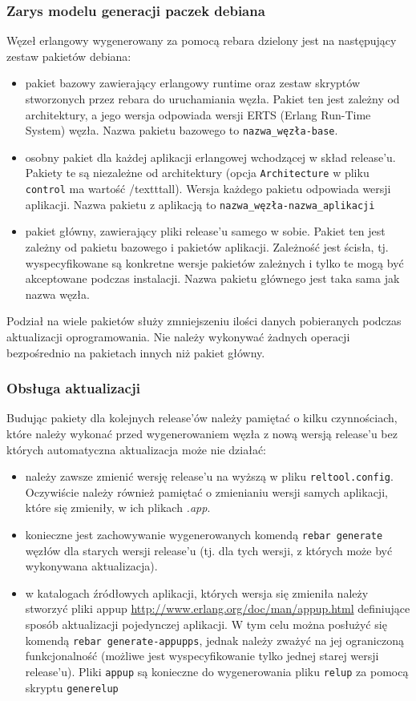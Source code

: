 \documentclass[polish,12pt]{aghthesis}
\begin{document}
\subsubsection{Zarys modelu generacji paczek debiana}
Węzeł erlangowy wygenerowany za pomocą rebara dzielony jest na następujący zestaw pakietów debiana:
\begin{itemize}
\item pakiet bazowy zawierający erlangowy runtime oraz zestaw skryptów stworzonych przez rebara do uruchamiania węzła. Pakiet ten jest zależny od architektury, a jego wersja odpowiada wersji ERTS (Erlang Run-Time System) węzła. Nazwa pakietu bazowego to \texttt{nazwa\_węzła-base}.
\item osobny pakiet dla każdej aplikacji erlangowej wchodzącej w skład release'u. Pakiety te są niezależne od architektury (opcja \texttt{Architecture} w pliku \texttt{control} ma wartość /texttt{all}). Wersja każdego pakietu odpowiada wersji aplikacji. Nazwa pakietu z aplikacją to \texttt{nazwa\_węzła-nazwa\_aplikacji}
\item pakiet główny, zawierający pliki release'u samego w sobie. Pakiet ten jest zależny od pakietu bazowego i pakietów aplikacji. Zależność jest ścisła, tj. wyspecyfikowane są konkretne wersje pakietów zależnych i tylko te mogą być akceptowane podczas instalacji. Nazwa pakietu głównego jest taka sama jak nazwa węzła.
\end{itemize}

Podział na wiele pakietów służy zmniejszeniu ilości danych pobieranych podczas aktualizacji oprogramowania. Nie należy wykonywać żadnych operacji bezpośrednio na pakietach innych niż pakiet główny.

\subsubsection{Obsługa aktualizacji}
Budując pakiety dla kolejnych release'ów należy pamiętać o kilku czynnościach, które należy wykonać przed wygenerowaniem węzła z nową wersją release'u bez których automatyczna aktualizacja może nie działać:
\begin{itemize}
\item należy zawsze zmienić wersję release'u na wyższą w pliku \texttt{reltool.config}. Oczywiście należy również pamiętać o zmienianiu wersji samych aplikacji, które się zmieniły, w ich plikach \emph{.app}.
\item konieczne jest zachowywanie wygenerowanych komendą \texttt{rebar generate} węzłów dla starych wersji release'u (tj. dla tych wersji, z których może być wykonywana aktualizacja).
\item w katalogach źródłowych aplikacji, których wersja się zmieniła należy stworzyć pliki appup \url{http://www.erlang.org/doc/man/appup.html} definiujące sposób aktualizacji pojedynczej aplikacji. W tym celu można posłużyć się komendą \texttt{rebar\ generate-appupps}, jednak należy zważyć na jej ograniczoną funkcjonalność (możliwe jest wyspecyfikowanie tylko jednej starej wersji release'u). Pliki \texttt{appup} są konieczne do wygenerowania pliku \texttt{relup} za pomocą skryptu \texttt{generelup}
\end{itemize}
\end{document}
